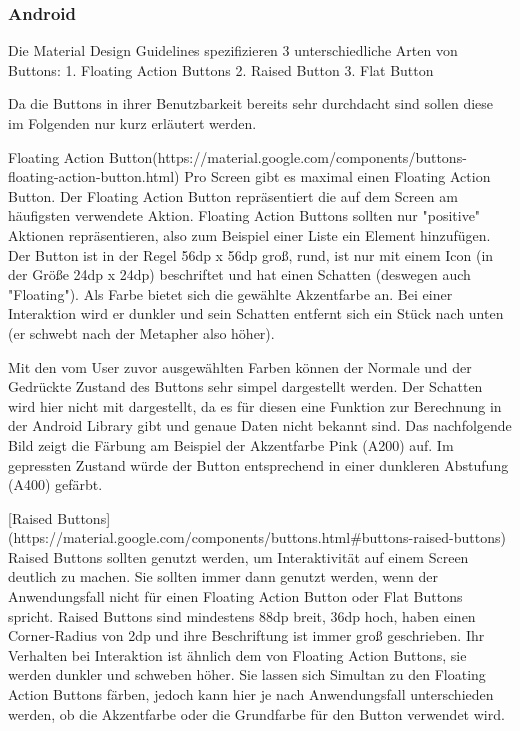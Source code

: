 \subsubsection{Android}

Die Material Design Guidelines spezifizieren 3 unterschiedliche Arten von Buttons:
 1. Floating Action Buttons
 2. Raised Button
 3. Flat Button

Da die Buttons in ihrer Benutzbarkeit bereits sehr durchdacht sind sollen diese im Folgenden nur kurz erläutert werden.

Floating Action Button(https://material.google.com/components/buttons-floating-action-button.html)
Pro Screen gibt es maximal einen Floating Action Button. Der Floating Action Button repräsentiert die auf dem Screen am häufigsten verwendete Aktion. Floating Action Buttons sollten nur "positive" Aktionen repräsentieren, also zum Beispiel einer Liste ein Element hinzufügen.
Der Button ist in der Regel 56dp x 56dp groß, rund, ist nur mit einem Icon (in der Größe 24dp x 24dp) beschriftet und hat einen Schatten (deswegen auch "Floating"). Als Farbe bietet sich die gewählte Akzentfarbe an. Bei einer Interaktion wird er dunkler und sein Schatten entfernt sich ein Stück nach unten (er schwebt nach der Metapher also höher).


Mit den vom User zuvor ausgewählten Farben können der Normale und der Gedrückte Zustand des Buttons sehr simpel dargestellt werden. Der Schatten wird hier nicht mit dargestellt, da es für diesen eine Funktion zur Berechnung in der Android Library gibt und genaue Daten nicht bekannt sind. Das nachfolgende Bild zeigt die Färbung am Beispiel der Akzentfarbe Pink (A200) auf. Im gepressten Zustand würde der Button entsprechend in einer dunkleren Abstufung (A400) gefärbt.


[Raised Buttons](https://material.google.com/components/buttons.html#buttons-raised-buttons)
Raised Buttons sollten genutzt werden, um Interaktivität auf einem Screen deutlich zu machen. Sie sollten immer dann genutzt werden, wenn der Anwendungsfall nicht für einen Floating Action Button oder Flat Buttons spricht.
Raised Buttons sind mindestens 88dp breit, 36dp hoch, haben einen Corner-Radius von 2dp und ihre Beschriftung ist immer groß geschrieben. Ihr Verhalten bei Interaktion ist ähnlich dem von Floating Action Buttons, sie werden dunkler und schweben höher.
Sie lassen sich Simultan zu den Floating Action Buttons färben, jedoch kann hier je nach Anwendungsfall unterschieden werden, ob die Akzentfarbe oder die Grundfarbe für den Button verwendet wird.

